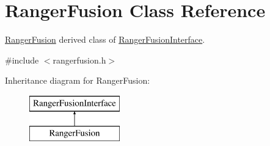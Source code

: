 \hypertarget{classRangerFusion}{}\section{Ranger\+Fusion Class Reference}
\label{classRangerFusion}


\hyperlink{classRangerFusion}{Ranger\+Fusion} derived class of \hyperlink{classRangerFusionInterface}{Ranger\+Fusion\+Interface}.  




{\ttfamily \#include $<$rangerfusion.\+h$>$}

Inheritance diagram for Ranger\+Fusion\+:\begin{figure}[H]
\begin{center}
\leavevmode
\includegraphics[height=2.000000cm]{classRangerFusion}
\end{center}
\end{figure}
